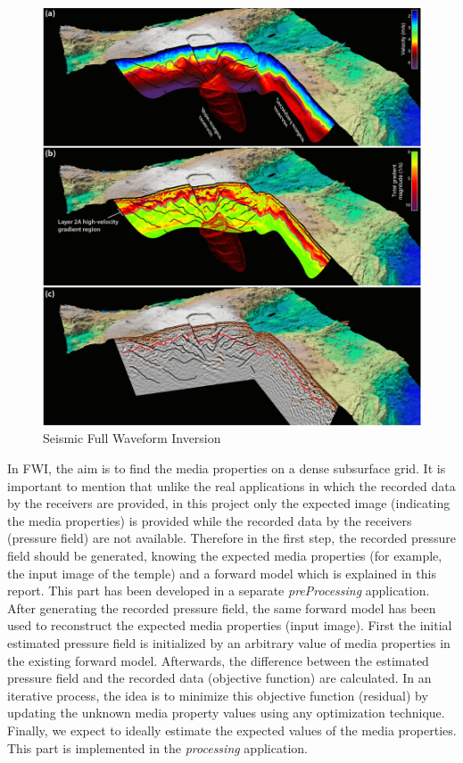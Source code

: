 \documentclass[10pt,a4paper]{article}
\begin{document}
\begin{figure}[h!]
  \includegraphics[width=0.75\linewidth]{FWI1.png}
  \caption{Seismic Full Waveform Inversion}
  \label{fig:FWI1}
\end{figure}

In FWI, the aim is to find the media properties on a dense subsurface grid. It is important to mention that unlike the real applications in which the recorded data by the receivers are provided, in this project only the expected image (indicating the media properties) is provided while the recorded data by the receivers (pressure field) are not available. Therefore in the first step, the recorded pressure field should be generated, knowing the expected media properties (for example, the input image of the temple) and a forward model which is explained in this report. This part has been developed in a separate \textit{preProcessing} application. After generating the recorded pressure field, the same forward model has been used to reconstruct the expected media properties (input image). First the initial estimated pressure field is initialized by an arbitrary value of media properties in the existing forward model. Afterwards, the difference between the estimated pressure field and the recorded data (objective function) are calculated. In an iterative process, the idea is to minimize this objective function (residual) by updating the unknown media property values using any optimization technique. Finally, we expect to ideally estimate the expected values of the media properties. This part is implemented in the \textit{processing} application.
\end{document}
